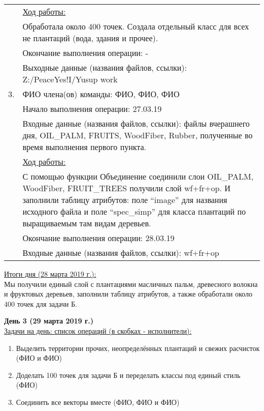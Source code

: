 \begin{center}
\begin{longtable}{|l|p{14.5cm}|}
           & \underline{Ход работы:} \\
           & Обработала около 400 точек. Создала отдельный класс для всех не плантаций (вода, здания и прочее). \\
           & Окончание выполнения операции: - \\
           & Выходные данные (названия файлов, ссылки):  Z:/PeaceYes!I/Yusup work \\
        \hline
        3. & ФИО члена(ов) команды: ФИО, ФИО, ФИО\\
           & Начало выполнения операции: 27.03.19 \\
           & Входные данные (названия файлов, ссылки): файлы вчерашнего дня, OIL\_PALM, FRUITS, WoodFiber, Rubber, полученные во время выполнения первого пункта. \\
           & \underline{Ход работы:} \\
           & С помощью функции Объединение соединили слои OIL\_PALM, WoodFiber, FRUIT\_TREES получили слой wf+fr+op. И заполнили таблицу атрибутов: поле “image” для названия исходного файла и поле “spec\_simp” для класса плантаций по выращиваемым там видам деревьев. \\
           & Окончание выполнения операции: 28.03.19\\
           & Входные данные (названия файлов, ссылки): wf+fr+op\\
        \hline
    \end{longtable}
\end{center}
\underline{Итоги дня (28 марта 2019 г.):}\\
Мы получили единый слой с плантациями масличных пальм, древесного волокна и фруктовых деревьев, заполнили таблицу атрибутов, а также обработали около 400 точек для задачи Б. 

\noindent\textbf{День 3 (29 марта 2019 г.)}\\

\noindent\underline{Задачи на день: список операций (в скобках - исполнители):}

\begin{enumerate}
   \item Выделить территории прочих, неопределённых плантаций и свежих расчисток (ФИО и ФИО)
   \item Доделать 100 точек для задачи Б и переделать классы под единый стиль (ФИО)
   \item Соединить все векторы вместе (ФИО, ФИО и ФИО)
\end{enumerate}

